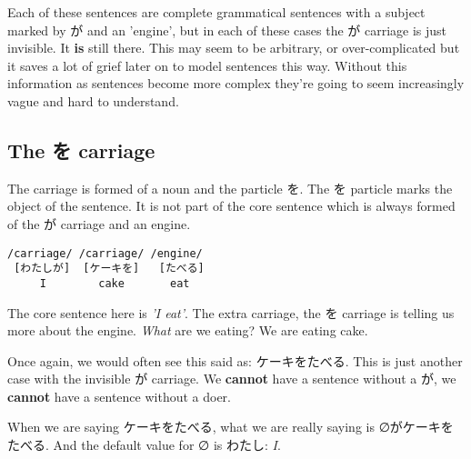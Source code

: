 \documentclass[11pt]{article}
\begin{document}
Each of these sentences are complete grammatical sentences with a subject marked by が and an 'engine', but in each of these cases the が carriage is just invisible. It \textbf{is} still there. This may seem to be arbitrary, or over-complicated but it saves a lot of grief later on to model sentences this way. Without this information as sentences become more complex they're going to seem increasingly vague and hard to understand.

\subsection{The を carriage}
\label{sec:orgb8261d3}
The carriage is formed of a noun and the particle を. The を particle marks the object of the sentence. It is not part of the core sentence which is always formed of the が carriage and an engine.

\begin{verbatim}
/carriage/ /carriage/ /engine/
 [わたしが]  [ケーキを]   [たべる]
     I        cake       eat
\end{verbatim}

The core sentence here is \emph{'I eat'}. The extra carriage, the を carriage is telling us more about the engine. \emph{What} are we eating? We are eating cake.

Once again, we would often see this said as: ケーキをたべる. This is just another case with the invisible が carriage. We \textbf{cannot} have a sentence without a が, we \textbf{cannot} have a sentence without a doer.

When we are saying ケーキをたべる, what we are really saying is ∅がケーキをたべる. And the default value for ∅ is わたし: \emph{I}.
\end{document}
